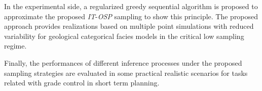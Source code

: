 In the experimental side, a regularized greedy sequential algorithm is proposed to approximate the proposed \emph{IT}-\emph{OSP} sampling to show this principle. The proposed approach provides realizations based on multiple point simulations with reduced variability for geological categorical facies models in the critical low sampling regime.

Finally, the performances of different inference processes under the proposed sampling strategies are evaluated in some practical realistic scenarios for tasks related with grade control in short term planning. 



